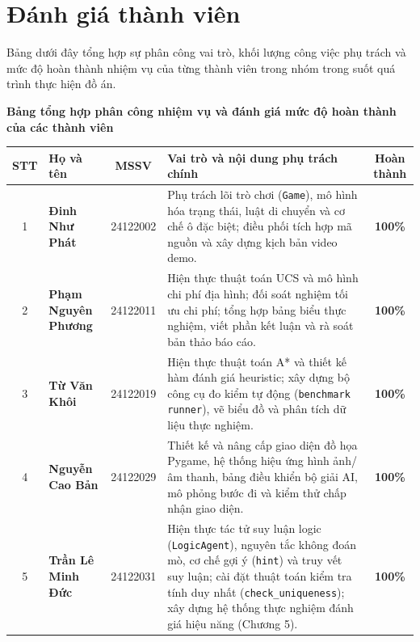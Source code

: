 \chapter*{Đánh giá thành viên}
{}

Bảng dưới đây tổng hợp sự phân công vai trò, khối lượng công việc phụ trách và mức độ hoàn thành nhiệm vụ của từng thành viên trong nhóm trong suốt quá trình thực hiện đồ án.

\begin{center}
\textbf{Bảng tổng hợp phân công nhiệm vụ và đánh giá mức độ hoàn thành của các thành viên}
\vspace{6pt}

\begingroup
\small
\setlength{\tabcolsep}{6pt}
\renewcommand{\arraystretch}{1.35}
\begin{tabularx}{\textwidth}{|c|l|c|X|c|}
\hline
\rowcolor{gray!15}
\textbf{STT} & \textbf{Họ và tên} & \textbf{MSSV} & \textbf{Vai trò và nội dung phụ trách chính} & \textbf{Hoàn thành} \\
\hline
1 & \textbf{Đinh Như Phát} & 24122002 & Phụ trách lõi trò chơi (\texttt{Game}), mô hình hóa trạng thái, luật di chuyển và cơ chế ô đặc biệt; điều phối tích hợp mã nguồn và xây dựng kịch bản video demo. & \textbf{100\%} \\
\hline
2 & \textbf{Phạm Nguyên Phương} & 24122011 & Hiện thực thuật toán UCS và mô hình chi phí địa hình; đối soát nghiệm tối ưu chi phí; tổng hợp bảng biểu thực nghiệm, viết phần kết luận và rà soát bản thảo báo cáo. & \textbf{100\%} \\
\hline
3 & \textbf{Từ Văn Khôi} & 24122019 & Hiện thực thuật toán A* và thiết kế hàm đánh giá heuristic; xây dựng bộ công cụ đo kiểm tự động (\texttt{benchmark runner}), vẽ biểu đồ và phân tích dữ liệu thực nghiệm. & \textbf{100\%} \\
\hline
4 & \textbf{Nguyễn Cao Bản} & 24122029 & Thiết kế và nâng cấp giao diện đồ họa Pygame, hệ thống hiệu ứng hình ảnh/âm thanh, bảng điều khiển bộ giải AI, mô phỏng bước đi và kiểm thử chấp nhận giao diện. & \textbf{100\%} \\
\hline
5 & \textbf{Trần Lê Minh Đức} & 24122031 & Hiện thực tác tử suy luận logic (\texttt{LogicAgent}), nguyên tắc không đoán mò, cơ chế gợi ý (\texttt{hint}) và truy vết suy luận; cài đặt thuật toán kiểm tra tính duy nhất (\texttt{check\_uniqueness}); xây dựng hệ thống thực nghiệm đánh giá hiệu năng (Chương 5). & \textbf{100\%} \\
\hline
\end{tabularx}
\endgroup
\end{center}

